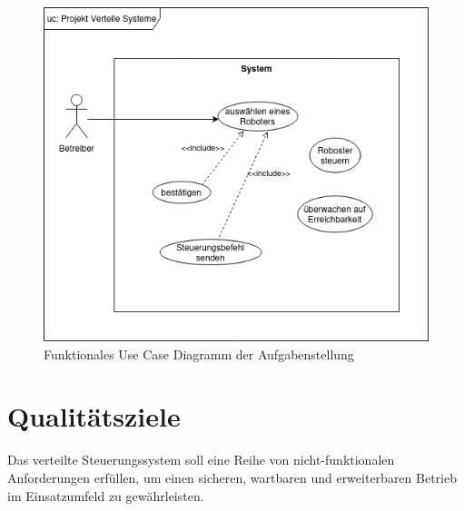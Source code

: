 \begin{figure}[h!]
	\centering
	\includegraphics[scale=.5]{diagrams/use_case.png}
	\caption{Funktionales Use Case Diagramm der Aufgabenstellung}
	\label{fig:meine-grafik}
\end{figure}

\newpage
\section{Qualitätsziele}

Das verteilte Steuerungssystem soll eine Reihe von nicht-funktionalen Anforderungen erfüllen, um einen sicheren, wartbaren und erweiterbaren Betrieb im Einsatzumfeld zu gewährleisten. 

